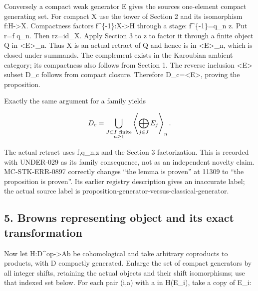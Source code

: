 Conversely a compact weak generator E gives the source\textquotesingle s one-element compact generating set. For compact X use the tower of Section 2 and its isomorphism f:\allowbreak{}H\allowbreak{}->X. Compactness factors f\textasciicircum{}\{-1\}:\allowbreak{}X\allowbreak{}->H through a stage:\allowbreak{} f\textasciicircum{}\{-1\}\allowbreak{}=q\_\allowbreak{}n z. Put r\allowbreak{}=f q\_\allowbreak{}n. Then rz\allowbreak{}=id\_\allowbreak{}X. Apply Section 3 to z to factor it through a finite object Q in <E>\_\allowbreak{}n. Thus X is an actual retract of Q and hence is in <E>\_\allowbreak{}n,\allowbreak{} which is closed under summands. The complement exists in the Karoubian ambient category; its compactness also follows from Section 1. The reverse inclusion \textless E\textgreater{} subset D\_\allowbreak{}c follows from compact closure. Therefore D\_\allowbreak{}c\allowbreak{}=<E>,\allowbreak{} proving the proposition.

Exactly the same argument for a family yields

\[
 D_c=\bigcup_{\substack{J\subset I\ {\rm finite}\\ n\geq1}}
          \left\langle\bigoplus_{j\in J}E_j\right\rangle_n .
\]

The actual retract uses f,\allowbreak{}q\_\allowbreak{}n,\allowbreak{}z and the Section 3 factorization. This is recorded with UNDER-029 as its family consequence,\allowbreak{} not as an independent novelty claim. MC-STK-ERR-0897 correctly changes ``the lemma is proven'' at 11309 to ``the proposition is proven''. Its earlier registry description gives an inaccurate label; the actual source label is proposition-generator-versus-classical-generator.

\subsection{5. Brown\textquotesingle s representing object and its exact transformation}\label{proofs-11121-11450-browns-representing-object-and-its-exact-transformation}

Now let H:\allowbreak{}D\textasciicircum{}op\allowbreak{}->Ab be cohomological and take arbitrary coproducts to products,\allowbreak{} with D compactly generated. Enlarge the set of compact generators by all integer shifts,\allowbreak{} retaining the actual objects and their shift isomorphisms; use that indexed set below. For each pair (i,\allowbreak{}a)\allowbreak{} with a in H(E\_\allowbreak{}i)\allowbreak{},\allowbreak{} take a copy of E\_\allowbreak{}i:\allowbreak{}

